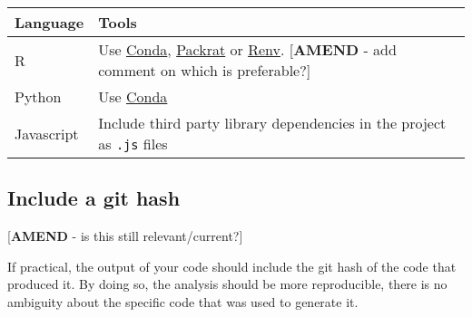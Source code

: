 \documentclass[]{book}
\begin{document}
\begin{longtable}[]{@{}ll@{}}
\toprule
\begin{minipage}[b]{0.20\columnwidth}\raggedright
Language\strut
\end{minipage} & \begin{minipage}[b]{0.74\columnwidth}\raggedright
Tools\strut
\end{minipage}\tabularnewline
\midrule
\endhead
\begin{minipage}[t]{0.20\columnwidth}\raggedright
R\strut
\end{minipage} & \begin{minipage}[t]{0.74\columnwidth}\raggedright
Use \href{https://github.com/moj-analytical-services/coffee-and-coding-public/blob/master/2019-10-30\%20Conda/conda.pdf}{Conda}, \href{https://rstudio.github.io/packrat/}{Packrat} or \href{https://blog.rstudio.com/2019/11/06/renv-project-environments-for-r/}{Renv}. {[}\textbf{AMEND} - add comment on which is preferable?{]}\strut
\end{minipage}\tabularnewline
\begin{minipage}[t]{0.20\columnwidth}\raggedright
Python\strut
\end{minipage} & \begin{minipage}[t]{0.74\columnwidth}\raggedright
Use \href{https://github.com/moj-analytical-services/coffee-and-coding-public/blob/master/2019-10-30\%20Conda/conda.pdf}{Conda}\strut
\end{minipage}\tabularnewline
\begin{minipage}[t]{0.20\columnwidth}\raggedright
Javascript\strut
\end{minipage} & \begin{minipage}[t]{0.74\columnwidth}\raggedright
Include third party library dependencies in the project as \texttt{.js} files\strut
\end{minipage}\tabularnewline
\bottomrule
\end{longtable}

\hypertarget{githash}{%
\subsection*{Include a git hash}\label{githash}}

{[}\textbf{AMEND} - is this still relevant/current?{]}

If practical, the output of your code should include the git hash of the code that produced it. By doing so, the analysis should be
more reproducible, there is no ambiguity about the specific code that was used to generate it.
\end{document}
